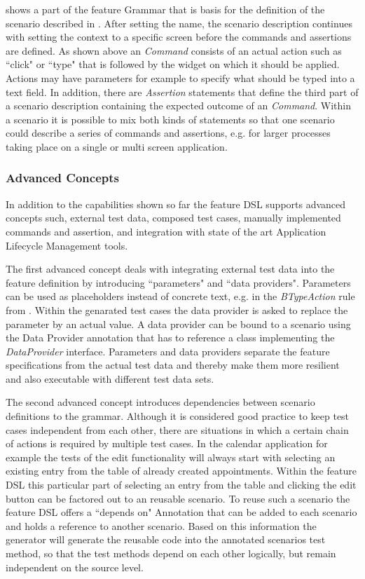 \documentclass{sig-alternate-05-2015}
\begin{document}
 shows a part of the feature Grammar that is basis for the definition of the scenario described in .
After setting the name, the scenario description continues with setting the context to a specific screen before the commands and assertions are defined.
As shown above an \textit{Command} consists of an actual action such as ``click" or ``type" that is followed by the widget on which it should be applied.
Actions may have parameters for example to specify what should be typed into a text field. 
In addition, there are \textit{Assertion} statements that define the third part of a scenario description containing the expected outcome of an \textit{Command}.
Within a scenario it is possible to mix both kinds of statements so that one scenario could describe a series of commands and assertions, e.g. for larger processes taking place on a single or multi screen application.   

\subsubsection{Advanced Concepts}
In addition to the capabilities shown so far the feature DSL supports advanced concepts such, external test data, composed test cases, manually implemented commands and assertion, and integration with state of the art Application Lifecycle Management tools.
 
The first advanced concept deals with integrating external test data into the feature definition by introducing ``parameters" and ``data providers".
Parameters can be used as placeholders instead of concrete text, e.g. in the \textit{BTypeAction} rule from .
Within the genarated test cases the data provider is asked to replace the parameter by an actual value.
A data provider can be bound to a scenario using the Data Provider annotation that has to reference a class implementing the \textit{DataProvider} interface.
Parameters and data providers separate the feature specifications from the actual test data and thereby make them more resilient and also executable with different test data sets.

The second advanced concept introduces dependencies between scenario definitions to the grammar.
Although it is considered good practice to keep test cases independent from each other, there are situations in which a certain chain of actions is required by multiple test cases.
In the calendar application for example the tests of the edit functionality will always start with selecting an existing entry from the table of already created appointments.
Within the feature DSL this particular part of selecting an entry from the table and clicking the edit button can be factored out to an reusable scenario.
To reuse such a scenario the feature DSL offers a ``depends on" Annotation that can be added to each scenario and holds a reference to another scenario.
Based on this information the generator will generate the reusable code into the annotated scenarios test method, so that the test methods depend on each other logically, but remain independent on the source level.
\end{document}
